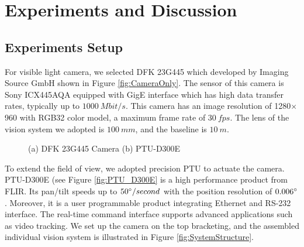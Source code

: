 \documentclass[journal,article,submit,moreauthors,pdftex,10pt,a4paper]{mdpi}
\begin{document}
\section{Experiments and Discussion}
\subsection{Experiments Setup}

For visible light camera, we selected DFK 23G445 which developed by Imaging Source GmbH shown in Figure  \ref{fig:CameraOnly}. The sensor of this camera is Sony ICX445AQA equipped with GigE interface which has high data transfer rates, typically up to $1000\ Mbit/s$. This camera has an image resolution of 1280$\times$960 with RGB32 color model, a maximum frame rate of $30\ fps$. The lens of the vision system we adopted is $100\ mm$, and the baseline is $10\ m$. 


\begin{figure}[!tb]
	\centering
	\caption{(a) DFK 23G445 Camera (b) PTU-D300E}
\end{figure}
To extend the field of view, we adopted precision PTU to actuate the camera. PTU-D300E (see Figure  \ref{fig:PTU_D300E} is a high performance product from FLIR. Its pan/tilt speeds up to $50\degree/second$ with the position resolution of $0.006\degree$. Moreover, it is a user programmable product integrating Ethernet  and RS-232 interface. The real-time command interface supports advanced applications such as video tracking. We set up the camera on the top bracketing, and the assembled individual vision system is illustrated in Figure  \ref{fig:SystemStructure}. 
\end{document}
